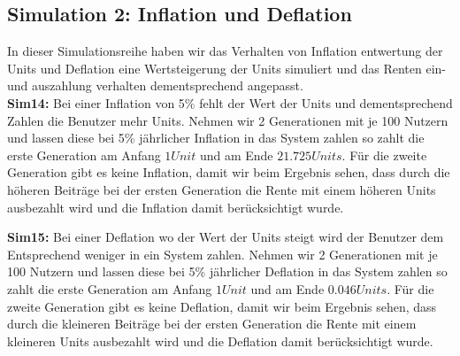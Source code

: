 \subsection{Simulation 2: Inflation und Deflation}

In dieser Simulationsreihe haben wir das Verhalten von Inflation entwertung der Units und Deflation eine Wertsteigerung der Units simuliert und das Renten ein- und auszahlung verhalten dementsprechend angepasst. \\

\textbf{Sim14:} Bei einer Inflation von 5\% fehlt der Wert der Units und dementsprechend Zahlen die Benutzer mehr Units. Nehmen wir 2 Generationen mit je 100 Nutzern und lassen diese bei 5\% jährlicher Inflation in das System zahlen so zahlt die erste Generation am Anfang $1 Unit$  und am Ende $21.725 Units$. Für die zweite Generation gibt es keine Inflation, damit wir beim Ergebnis sehen, dass durch die höheren Beiträge bei der ersten Generation die Rente mit einem höheren Units ausbezahlt wird und die Inflation damit berücksichtigt wurde. \\

\begin{table}[h!]
\centering
{}
\end{table}

\textbf{Sim15:} Bei einer Deflation wo der Wert der Units steigt wird der Benutzer dem Entsprechend weniger in ein System zahlen. Nehmen wir 2 Generationen mit je 100 Nutzern und lassen diese bei 5\% jährlicher Deflation in das System zahlen so zahlt die erste Generation am Anfang $1 Unit$  und am Ende $0.046 Units$. Für die zweite Generation gibt es keine Deflation, damit wir beim Ergebnis sehen, dass durch die kleineren Beiträge bei der ersten Generation die Rente mit einem kleineren Units ausbezahlt wird und die Deflation damit berücksichtigt wurde. \\


